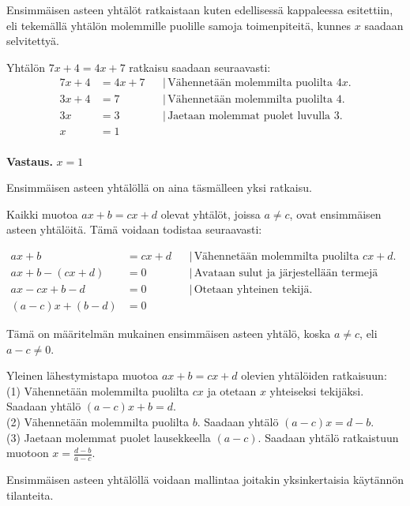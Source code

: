 Ensimmäisen asteen yhtälöt ratkaistaan kuten edellisessä kappaleessa esitettiin, eli tekemällä yhtälön molemmille puolille 
samoja toimenpiteitä, kunnes $x$ saadaan selvitettyä. 

\begin{esimerkki}
Yhtälön $7x+4=4x+7$ ratkaisu saadaan seuraavasti:
\begin{align*}
7x+4 &= 4x+7 & &| \, \text{Vähennetään molemmilta puolilta $4x$.} \\
3x+4 &= 7 & &| \, \text{Vähennetään molemmilta puolilta 4.} \\
3x &= 3 & &| \, \text{Jaetaan molemmat puolet luvulla 3.} \\
x &= 1 & & \\
\end{align*}

\textbf{Vastaus.} $x=1$
\end{esimerkki}

Ensimmäisen asteen yhtälöllä on aina täsmälleen yksi ratkaisu.

Kaikki muotoa $ax+b=cx+d$ olevat yhtälöt, joissa $a \neq c$, ovat ensimmäisen asteen yhtälöitä. Tämä voidaan todistaa seuraavasti:

\begin{align*}
ax+b &= cx+d & &| \, \text{Vähennetään molemmilta puolilta $cx+d$}. \\
ax+b - (cx+d) &= 0 & &| \, \text{Avataan sulut ja järjestellään termejä uudelleen.} \\
ax - cx + b - d &= 0 & &| \, \text{Otetaan yhteinen tekijä.} \\
(a-c)x + (b-d) &= 0 & &
\end{align*}

Tämä on määritelmän mukainen ensimmäisen asteen yhtälö, koska $a \neq c$, eli $a-c \neq 0$.

\begin{esimerkki}
Yleinen lähestymistapa muotoa $ax+b = cx+d$ olevien yhtälöiden ratkaisuun: \\
(1) Vähennetään molemmilta puolilta $cx$ ja otetaan $x$ yhteiseksi tekijäksi. Saadaan yhtälö $(a-c)x + b = d$. \\
(2) Vähennetään molemmilta puolilta $b$. Saadaan yhtälö $(a-c)x = d-b$. \\
(3) Jaetaan molemmat puolet lausekkeella $(a-c)$. Saadaan yhtälö ratkaistuun muotoon $x = \frac{d-b}{a-c}$. 
\end{esimerkki}

Ensimmäisen asteen yhtälöllä voidaan mallintaa joitakin yksinkertaisia käytännön tilanteita. 

